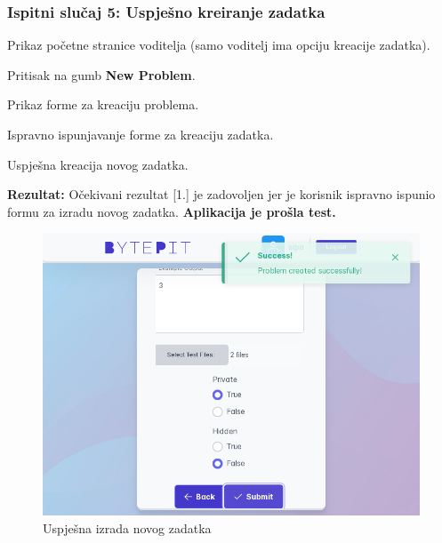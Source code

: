 			\subsubsection{Ispitni slučaj 5: Uspješno kreiranje zadatka}
			
			
			\begin{packed_enum}
				
				\item  Prikaz početne stranice voditelja (samo voditelj ima opciju kreacije zadatka).
				\item  Pritisak na gumb \textbf{New Problem}.
				\item  Prikaz forme za kreaciju problema.
				\item  Ispravno ispunjavanje forme za kreaciju zadatka.
				
			\end{packed_enum}
			
			\begin{packed_enum}
				
				\item  Uspješna kreacija novog zadatka.
				
			\end{packed_enum}
			
			\noindent \textbf{Rezultat:} Očekivani rezultat [1.] je zadovoljen jer je korisnik ispravno ispunio formu za izradu novog zadatka. \textbf{Aplikacija je prošla test.}
			
			\begin{figure}[H]
				\includegraphics[scale=0.38]{slike/create_problem_test.PNG}
				\centering
				\caption{Uspješna izrada novog zadatka}
				\label{fig:sucess_new_problem}
			\end{figure}
			
